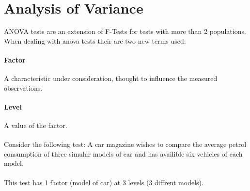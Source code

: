 \newpage
\section{Analysis of Variance}
ANOVA tests are an extension of F-Tests for tests with more than 2 populations. When dealing with anova tests their are two new terms used:
\paragraph{Factor} A characteristic under consideration, thought to influence the measured observations.
\paragraph{Level} A value of the factor.\\
\\
Consider the following test:
A car magazine wishes to compare the average petrol consumption of three simular models of car and has availible six vehicles of each model. \\
\\
This test has 1 factor (model of car) at 3 levels (3 diffrent models).

    \newpage
